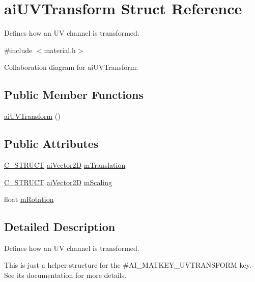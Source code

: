 \hypertarget{structai_u_v_transform}{\section{ai\-U\-V\-Transform Struct Reference}
\label{structai_u_v_transform}
}


Defines how an U\-V channel is transformed.  




{\ttfamily \#include $<$material.\-h$>$}



Collaboration diagram for ai\-U\-V\-Transform\-:
\subsection*{Public Member Functions}
\begin{DoxyCompactItemize}
\item 
\hyperlink{structai_u_v_transform_a8d8fe3de479933ab7fc0e55fc25e51b9}{ai\-U\-V\-Transform} ()
\end{DoxyCompactItemize}
\subsection*{Public Attributes}
\begin{DoxyCompactItemize}
\item 
\hyperlink{defs_8h_ab51df4230ceb602bbc1bc109c432a6a0}{C\-\_\-\-S\-T\-R\-U\-C\-T} \hyperlink{structai_vector2_d}{ai\-Vector2\-D} \hyperlink{structai_u_v_transform_a8c7f35959aa342bf0cef670246fbb813}{m\-Translation}
\item 
\hyperlink{defs_8h_ab51df4230ceb602bbc1bc109c432a6a0}{C\-\_\-\-S\-T\-R\-U\-C\-T} \hyperlink{structai_vector2_d}{ai\-Vector2\-D} \hyperlink{structai_u_v_transform_a89429a027cbf914e7212e48149a957c8}{m\-Scaling}
\item 
float \hyperlink{structai_u_v_transform_aa8dcf39ccd39f786b3f5f163bd663792}{m\-Rotation}
\end{DoxyCompactItemize}


\subsection{Detailed Description}
Defines how an U\-V channel is transformed. 

This is just a helper structure for the \#\-A\-I\-\_\-\-M\-A\-T\-K\-E\-Y\-\_\-\-U\-V\-T\-R\-A\-N\-S\-F\-O\-R\-M key. See its documentation for more details.

